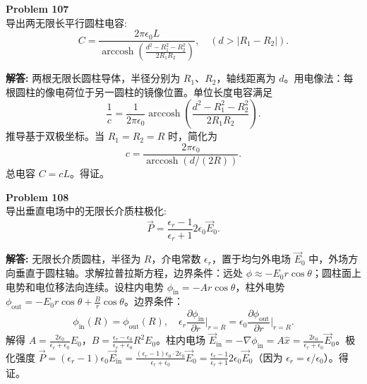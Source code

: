 \documentclass[12pt, a4paper, oneside]{ctexart}
\newenvironment{solution}{\par\noindent\textbf{解答:}\quad}{\par}
\begin{document}
\begin{mdframed}[backgroundcolor=gray!10, linewidth=0pt]
    \textbf{Problem 107} \\
    导出两无限长平行圆柱电容:
    \[
    C = \frac{2\pi\epsilon_0 L}{\operatorname{arccosh}\left( \frac{d^2 - R_1^2 - R_2^2}{2R_1 R_2} \right)}, \quad (d > |R_1 - R_2|).
    \]
\end{mdframed}
\begin{solution}
    两根无限长圆柱导体，半径分别为 $R_1$、$R_2$，轴线距离为 $d$。用电像法：每根圆柱的像电荷位于另一圆柱的镜像位置。单位长度电容满足
    \[
    \frac{1}{c} = \frac{1}{2\pi\epsilon_0} \operatorname{arccosh} \left( \frac{d^2 - R_1^2 - R_2^2}{2R_1 R_2} \right).
    \]
    推导基于双极坐标。当 $R_1 = R_2 = R$ 时，简化为
    \[
    c = \frac{2\pi\epsilon_0}{\operatorname{arccosh}(d/(2R))}.
    \]
    总电容 $C = c L$。得证。
\end{solution}

\begin{mdframed}[backgroundcolor=gray!10, linewidth=0pt]
    \textbf{Problem 108} \\
    导出垂直电场中的无限长介质柱极化:
    \[
    \vec{P} = \frac{\epsilon_r - 1}{\epsilon_r + 1} 2\epsilon_0 \vec{E}_0.
    \]
\end{mdframed}
\begin{solution}
    无限长介质圆柱，半径为 $R$，介电常数 $\epsilon_r$，置于均匀外电场 $\vec{E}_0$ 中，外场方向垂直于圆柱轴。求解拉普拉斯方程，边界条件：远处 $\phi \approx -E_0 r \cos\theta$；圆柱面上电势和电位移法向连续。设柱内电势 $\phi_{\text{in}} = -A r \cos\theta$，柱外电势 $\phi_{\text{out}} = -E_0 r \cos\theta + \frac{B}{r} \cos\theta$。边界条件：
    \[
    \phi_{\text{in}}(R) = \phi_{\text{out}}(R), \quad \epsilon_r \frac{\partial \phi_{\text{in}}}{\partial r} \bigg|_{r=R} = \epsilon_0 \frac{\partial \phi_{\text{out}}}{\partial r} \bigg|_{r=R}.
    \]
    解得 $A = \frac{2\epsilon_0}{\epsilon_r + \epsilon_0} E_0$，$B = \frac{\epsilon_r - \epsilon_0}{\epsilon_r + \epsilon_0} R^2 E_0$。柱内电场 $\vec{E}_{\text{in}} = -\nabla \phi_{\text{in}} = A \hat{x} = \frac{2\epsilon_0}{\epsilon_r + \epsilon_0} \vec{E}_0$。极化强度 $\vec{P} = (\epsilon_r - 1)\epsilon_0 \vec{E}_{\text{in}} = \frac{(\epsilon_r - 1)\epsilon_0 \cdot 2\epsilon_0}{\epsilon_r + \epsilon_0} \vec{E}_0 = \frac{\epsilon_r - 1}{\epsilon_r + 1} 2\epsilon_0 \vec{E}_0$（因为 $\epsilon_r = \epsilon/\epsilon_0$）。得证。
\end{solution}
\end{document}
